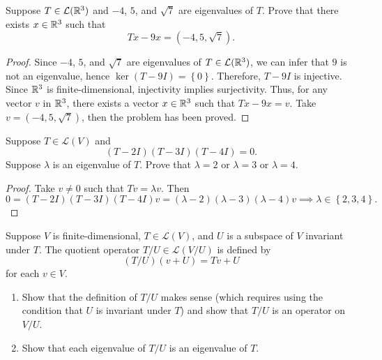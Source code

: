 \documentclass{article}
\begin{document}
\begin{problem}[5A-29]
Suppose $T \in \mathcal{L}(\mathbb{R}^3)$ and $-4$, $5$, and $\sqrt{7}$ are eigenvalues of $T$. Prove that there exists $x \in \mathbb{R}^3$ such that
\[
Tx - 9x = (-4, 5, \sqrt{7}).
\]
\end{problem}

\begin{proof}
  Since $-4$, $5$, and $\sqrt{7}$ are eigenvalues of $T\in \mathcal{L}(\mathbb{R}^3)$, we can infer that \( 9 \) is not an eigenvalue, hence \( \ker (T-9I)=\left\{ 0 \right\} \). Therefore, \( T-9I \) is injective. Since \( \mathbb{R}^3 \) is finite-dimensional, injectivity implies surjectivity. Thus, for any vector \( v \) in \( \mathbb{R}^3 \), there exists a vector \( x \in \mathbb{R}^3 \) such that \( Tx-9x=v \). Take \( v=(-4,5,\sqrt{7}) \), then the problem has been proved.
\end{proof}



\begin{problem}[5A-30]
Suppose $T \in \mathcal{L}(V)$ and
\[
(T - 2I)(T - 3I)(T - 4I) = 0.
\]
Suppose $\lambda$ is an eigenvalue of $T$. Prove that $\lambda = 2$ or $\lambda = 3$ or $\lambda = 4$.
\end{problem}

\begin{proof}
  Take \( v\neq0 \) such that \( Tv=\lambda v \). Then
  \[ 0=(T-2I)(T-3I)(T-4I)v=(\lambda-2)(\lambda-3)(\lambda-4)v\implies\lambda\in \left\{ 2, 3, 4 \right\}. \]
\end{proof}



\begin{problem}[5A-38]
Suppose $V$ is finite-dimensional, $T \in \mathcal{L}(V)$, and $U$ is a subspace of $V$ invariant under $T$. The quotient operator $T/U \in \mathcal{L}(V/U)$ is defined by
\[
(T/U)(v + U) = Tv + U
\]
for each $v \in V$.
\begin{enumerate}[label=(\alph*)]
	\item Show that the definition of $T/U$ makes sense (which requires using the condition that $U$ is invariant under $T$) and show that $T/U$ is an operator on $V/U$.
	\item Show that each eigenvalue of $T/U$ is an eigenvalue of $T$.
\end{enumerate}
\end{problem}
\end{document}
